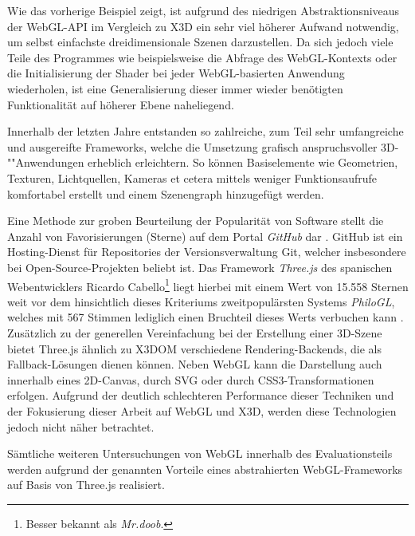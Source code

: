 Wie das vorherige Beispiel zeigt, ist aufgrund des niedrigen Abstraktionsniveaus der WebGL-API im Vergleich zu X3D ein sehr viel höherer Aufwand notwendig, um selbst einfachste dreidimensionale Szenen darzustellen. Da sich jedoch viele Teile des Programmes wie beispielsweise die Abfrage des WebGL-Kontexts oder die Initialisierung der Shader bei jeder WebGL-basierten Anwendung wiederholen, ist eine Generalisierung dieser immer wieder benötigten Funktionalität auf höherer Ebene naheliegend.

Innerhalb der letzten Jahre entstanden so zahlreiche, zum Teil sehr umfangreiche und ausgereifte Frameworks, welche die Umsetzung grafisch anspruchsvoller 3D-""Anwendungen erheblich erleichtern. So können Basiselemente wie Geometrien, Texturen, Lichtquellen, Kameras et cetera mittels weniger Funktionsaufrufe komfortabel erstellt und einem Szenengraph hinzugefügt werden.

Eine Methode zur groben Beurteilung der Popularität von Software stellt die Anzahl von Favorisierungen (Sterne) auf dem Portal \emph{GitHub} dar \autocite{Evans201443}. GitHub ist ein Hosting-Dienst für Repositories der Versionsverwaltung Git, welcher insbesondere bei Open-Source-Projekten beliebt ist. Das Framework \emph{Three.js} des spanischen Webentwicklers Ricardo Cabello\footnote{Besser bekannt als \emph{Mr.doob}.} liegt hierbei mit einem Wert von 15.558 Sternen weit vor dem hinsichtlich dieses Kriteriums zweitpopulärsten Systems \emph{PhiloGL}, welches mit 567 Stimmen lediglich einen Bruchteil dieses Werts verbuchen kann \autocite{SOFTWARE_GITHUB_THREEJS} \autocite{SOFTWARE_GITHUB_PHILOGL}.
Zusätzlich zu der generellen Vereinfachung bei der Erstellung einer 3D-Szene bietet Three.js ähnlich zu X3DOM verschiedene Rendering-Backends, die als Fallback-Lösungen dienen können. Neben WebGL kann die Darstellung auch innerhalb eines 2D-Canvas, durch SVG oder durch CSS3-Transformationen erfolgen. Aufgrund der deutlich schlechteren Performance dieser Techniken und der Fokusierung dieser Arbeit auf WebGL und X3D, werden diese Technologien jedoch nicht näher betrachtet.

Sämtliche weiteren Untersuchungen von WebGL innerhalb des Evaluationsteils werden aufgrund der genannten Vorteile eines abstrahierten WebGL-Frameworks auf Basis von Three.js realisiert.
